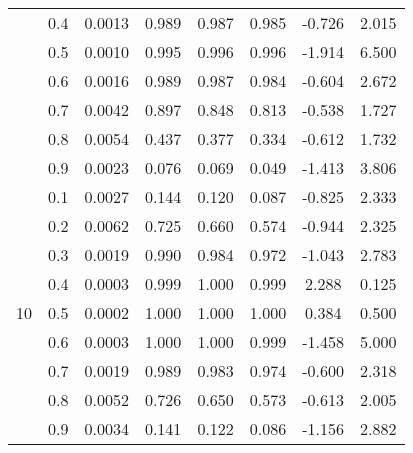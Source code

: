 \documentclass[11pt,a4paper]{report}
\begin{document}
\begin{longtable}{ | c | c || c | c | c | c | c | c | }
 & 0.4 & 0.0013 & 0.989 & 0.987 & 0.985 & -0.726 & 2.015 \\
 & 0.5 & 0.0010 & 0.995 & 0.996 & 0.996 & -1.914 & 6.500 \\
 & 0.6 & 0.0016 & 0.989 & 0.987 & 0.984 & -0.604 & 2.672 \\
 & 0.7 & 0.0042 & 0.897 & 0.848 & 0.813 & -0.538 & 1.727 \\
 & 0.8 & 0.0054 & 0.437 & 0.377 & 0.334 & -0.612 & 1.732 \\
 & 0.9 & 0.0023 & 0.076 & 0.069 & 0.049 & -1.413 & 3.806 \\
 \hline
\multirow{9}{*}{10} & 0.1 & 0.0027 & 0.144 & 0.120 & 0.087 & -0.825 & 2.333 \\
 & 0.2 & 0.0062 & 0.725 & 0.660 & 0.574 & -0.944 & 2.325 \\
 & 0.3 & 0.0019 & 0.990 & 0.984 & 0.972 & -1.043 & 2.783 \\
 & 0.4 & 0.0003 & 0.999 & 1.000 & 0.999 & 2.288 & 0.125 \\
 & 0.5 & 0.0002 & 1.000 & 1.000 & 1.000 & 0.384 & 0.500 \\
 & 0.6 & 0.0003 & 1.000 & 1.000 & 0.999 & -1.458 & 5.000 \\
 & 0.7 & 0.0019 & 0.989 & 0.983 & 0.974 & -0.600 & 2.318 \\
 & 0.8 & 0.0052 & 0.726 & 0.650 & 0.573 & -0.613 & 2.005 \\
 & 0.9 & 0.0034 & 0.141 & 0.122 & 0.086 & -1.156 & 2.882 \\
 \hline
\hline
\end{longtable}
\end{document}
